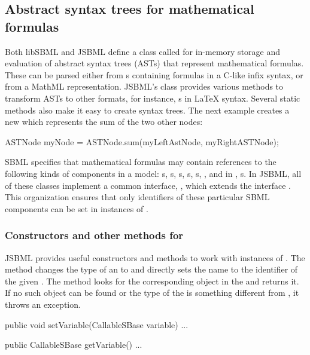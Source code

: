 \subsection{Abstract syntax trees for mathematical formulas}

Both libSBML and JSBML define a class called \ASTNode for in-memory storage
and evaluation of abstract syntax trees (ASTs) that represent mathematical
formulas. These can be parsed either from \String{}s containing formulas in a
C-like infix syntax, or from a MathML  representation.  JSBML's
\ASTNode class provides various methods to transform ASTs to other formats,
for instance, s in \LaTeX {} syntax.  Several static methods also
make it easy to create syntax trees.  The next example creates a new
\ASTNode which represents the sum of the two other nodes:

\begin{example}
ASTNode myNode = ASTNode.sum(myLeftAstNode, myRightASTNode);
\end{example}

SBML specifies that mathematical formulas may contain references to the
following kinds of components in a model: \Parameter{}s,
\LocalParameter{}s, \FunctionDefinition{}s, \Reaction{}s, \Compartment{}s,
\Species, and in \SBMLthree, \SpeciesReference{}s.  In JSBML, all of these
classes implement a common interface, \CallableSBase, which extends
the interface \NamedSBaseWithDerivedUnit. This organization ensures that
only identifiers of these particular SBML components can be set in
instances of \ASTNode.


\subsubsection{Constructors and other methods for \CallableSBase}

JSBML provides useful constructors and methods to work with instances of
\CallableSBase.  The  method changes the type of an \ASTNode to
\ASTTypeName and directly sets the name to the identifier of the given
\CallableSBase.  The  method looks for the corresponding object in
the \Model and returns it. If no such object can be found or the type of the
\ASTNode is something different from \ASTTypeName, it throws an exception.

\begin{example}[style=java, title={Getter and setter for \CallableSBase.}]
public void setVariable(CallableSBase variable) { ... }

public CallableSBase getVariable() { ... }
\end{example}

